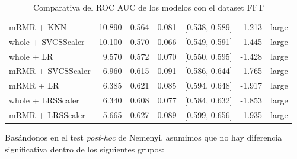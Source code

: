 \documentclass[a4paper,oneside,11pt,leqno]{article}
\begin{document}
\begin{table}[h]
\begin{tabular}{lrrrlll}
			mRMR + KNN         & 10.890 & 0.564 & 0.081 &  [0.538, 0.589] & -1.213 &       large \\
			whole + SVCSScaler & 10.100 & 0.570 & 0.066 &  [0.549, 0.591] & -1.445 &       large \\
			whole + LR         &  9.570 & 0.572 & 0.070 &  [0.550, 0.595] & -1.428 &       large \\
			mRMR + SVCSScaler  &  6.960 & 0.615 & 0.091 &  [0.586, 0.644] & -1.765 &       large \\
			mRMR + LR          &  6.385 & 0.621 & 0.085 &  [0.594, 0.648] & -1.917 &       large \\
			whole + LRSScaler  &  6.340 & 0.608 & 0.077 &  [0.584, 0.632] & -1.853 &       large \\
			mRMR + LRSScaler   &  5.665 & 0.627 & 0.089 &  [0.599, 0.656] & -1.935 &       large \\
			\bottomrule
		\end{tabular}
		\caption{Comparativa del ROC AUC de los modelos con el dataset FFT}
		\label{tab:stat_results_fft}
	\end{table}
	
	Basándonos en el test \textit{post-hoc} de Nemenyi, asumimos que no hay diferencia significativa dentro de los siguientes grupos:
	
\end{document}
